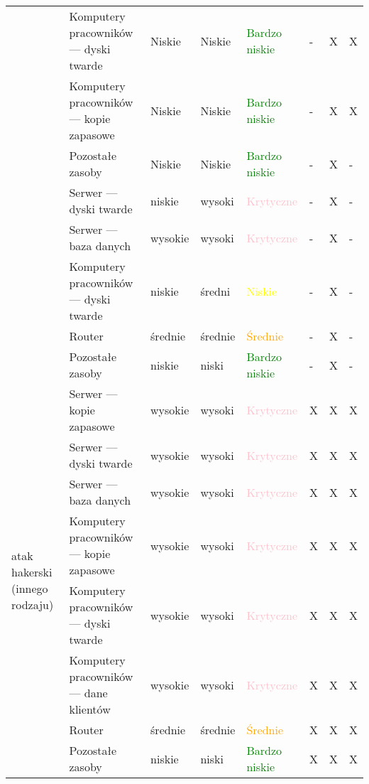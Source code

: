 \begin{landscape}
\begin{longtable}[ht!]{|m{3cm}|m{6cm}|m{4.5cm}|m{3cm}|m{3cm}|m{0.5cm}|m{0.5cm}|m{0.5cm}|}
		& Komputery pracowników --- dyski twarde & Niskie & Niskie & \textcolor{green}{Bardzo niskie} & - & X & X  \\ \cline{2-8}
		& Komputery pracowników --- kopie zapasowe & Niskie & Niskie & \textcolor{green}{Bardzo niskie} & - & X & X  \\ \cline{2-8}
		& Pozostałe zasoby & Niskie & Niskie & \textcolor{green}{Bardzo niskie} & - & X & -  \\
		\hline
		\newpage
		\hline
		\multirow{4}{4cm}{atak DDoS}
		& Serwer --- dyski twarde & niskie  & wysoki & \textcolor{pink}{Krytyczne} & - & X & -  \\ \cline{2-8}
		& Serwer --- baza danych & wysokie & wysoki & \textcolor{pink}{Krytyczne} & - & X & -  \\ \cline{2-8} 
		& Komputery pracowników --- dyski twarde  & niskie  & średni & \textcolor{yellow}{Niskie} & - & X & -  \\ \cline{2-8}
		& Router & średnie  & średnie & \textcolor{orange}{Średnie} & - & X & -  \\ \cline{2-8} 
		& Pozostałe zasoby & niskie  & niski & \textcolor{green}{Bardzo niskie} & - & X & -  \\
		\hline
		\multirow{8}{4cm}{atak hakerski \linebreak (innego rodzaju)}
		& Serwer --- kopie zapasowe  & wysokie & wysoki & \textcolor{pink}{Krytyczne} & X & X & X  \\ \cline{2-8}
		& Serwer --- dyski twarde & wysokie  & wysoki & \textcolor{pink}{Krytyczne} & X & X & X  \\ \cline{2-8}
		& Serwer --- baza danych & wysokie & wysoki & \textcolor{pink}{Krytyczne} & X & X & X  \\ \cline{2-8}
		& Komputery pracowników --- kopie zapasowe & wysokie & wysoki & \textcolor{pink}{Krytyczne} & X & X & X  \\ \cline{2-8}
		& Komputery pracowników --- dyski twarde  & wysokie  & wysoki & \textcolor{pink}{Krytyczne}& X & X & X  \\ \cline{2-8}
		& Komputery pracowników --- dane klientów & wysokie & wysoki & \textcolor{pink}{Krytyczne} & X & X & X  \\ \cline{2-8}
		& Router & średnie  & średnie & \textcolor{orange}{Średnie} & X & X & X  \\ \cline{2-8}
		& Pozostałe zasoby & niskie  & niski & \textcolor{green}{Bardzo niskie} & X & X & X  \\
		\hline
	\end{longtable}
\end{landscape}



